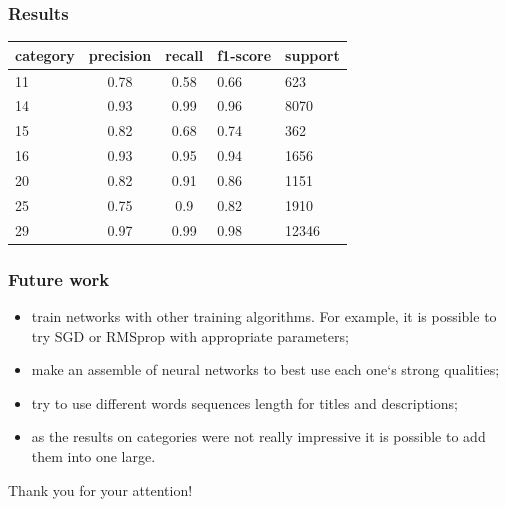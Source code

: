 \documentclass[14pt]{beamer}
\begin{document}
		\begin{frame}
			\frametitle{Results}
			\begin{longtable}[c]{|l|c|c|l|l|}
				\hline  category & precision & recall &  f1-score & support\\ \hline
				\endhead
				\hline
				\endlastfoot

				11       & 0.78      & 0.58   & 0.66     & 623     \\
				14       & 0.93      & 0.99   & 0.96     & 8070    \\
				15       & 0.82      & 0.68   & 0.74     & 362     \\
				16       & 0.93      & 0.95   & 0.94     & 1656    \\
				20       & 0.82      & 0.91   & 0.86     & 1151    \\
				25       & 0.75      & 0.9    & 0.82     & 1910    \\
				29       & 0.97      & 0.99   & 0.98     & 12346   \\
				\hline
			\end{longtable}
		\end{frame}
		
		\begin{frame}
			\frametitle{Future work}
			\begin{itemize}
				\item train networks with other training algorithms. For example, it is possible
				to try SGD or RMSprop with appropriate parameters;
				\item make an assemble of neural networks to best use each one‘s strong qualities;
				\item try to use different words sequences length for titles and descriptions;
				\item as the results on categories were not really impressive it is possible to add
				them into one large.
			\end{itemize}
		\end{frame}
		

		\begin{frame}
			\begin{center}
					Thank you for your attention!
			\end{center}
		\end{frame}
		
	
\end{document}
